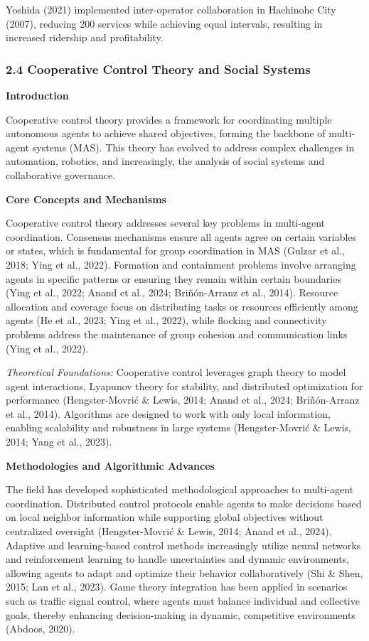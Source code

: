 Yoshida (2021) implemented inter-operator collaboration in Hachinohe City (2007), reducing 200 services while achieving equal intervals, resulting in increased ridership and profitability.

\subsubsection{2.4 Cooperative Control Theory and Social Systems}\label{cooperative-control-theory-and-social-systems}

\textbf{Introduction}

Cooperative control theory provides a framework for coordinating multiple autonomous agents to achieve shared objectives, forming the backbone of multi-agent systems (MAS). This theory has evolved to address complex challenges in automation, robotics, and increasingly, the analysis of social systems and collaborative governance.

\textbf{Core Concepts and Mechanisms}

Cooperative control theory addresses several key problems in multi-agent coordination. Consensus mechanisms ensure all agents agree on certain variables or states, which is fundamental for group coordination in MAS (Gulzar et al., 2018; Ying et al., 2022). Formation and containment problems involve arranging agents in specific patterns or ensuring they remain within certain boundaries (Ying et al., 2022; Anand et al., 2024; Briñón-Arranz et al., 2014). Resource allocation and coverage focus on distributing tasks or resources efficiently among agents (He et al., 2023; Ying et al., 2022), while flocking and connectivity problems address the maintenance of group cohesion and communication links (Ying et al., 2022).

\emph{Theoretical Foundations:} Cooperative control leverages graph theory to model agent interactions, Lyapunov theory for stability, and distributed optimization for performance (Hengster-Movrić \& Lewis, 2014; Anand et al., 2024; Briñón-Arranz et al., 2014). Algorithms are designed to work with only local information, enabling scalability and robustness in large systems (Hengster-Movrić \& Lewis, 2014; Yang et al., 2023).

\textbf{Methodologies and Algorithmic Advances}

The field has developed sophisticated methodological approaches to multi-agent coordination. Distributed control protocols enable agents to make decisions based on local neighbor information while supporting global objectives without centralized oversight (Hengster-Movrić \& Lewis, 2014; Anand et al., 2024). Adaptive and learning-based control methods increasingly utilize neural networks and reinforcement learning to handle uncertainties and dynamic environments, allowing agents to adapt and optimize their behavior collaboratively (Shi \& Shen, 2015; Lan et al., 2023). Game theory integration has been applied in scenarios such as traffic signal control, where agents must balance individual and collective goals, thereby enhancing decision-making in dynamic, competitive environments (Abdoos, 2020).

